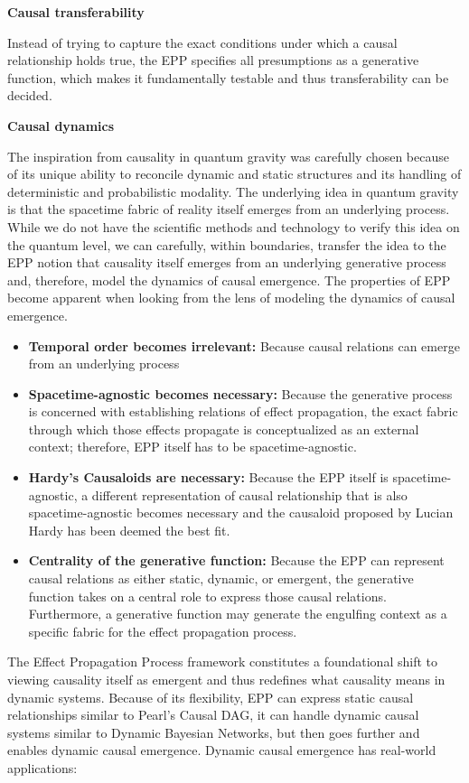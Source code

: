 \textbf{Causal transferability}

Instead of trying to capture the exact conditions under which a causal relationship holds true, the EPP specifies all presumptions as a generative function, which makes it fundamentally testable and thus transferability can be decided.

\textbf{Causal dynamics}

The inspiration from causality in quantum gravity was carefully chosen because of its unique ability to reconcile dynamic and static structures and its handling of deterministic and probabilistic modality. The underlying idea in quantum gravity is that the spacetime fabric of reality itself emerges from an underlying process. While we do not have the scientific methods and technology to verify this idea on the quantum level, we can carefully, within boundaries, transfer the idea to the EPP notion that causality itself emerges from an underlying generative process and, therefore, model the dynamics of causal emergence. The properties of EPP become apparent when looking from the lens of modeling the dynamics of causal emergence.

\begin{itemize}
    \item \textbf{Temporal order becomes irrelevant:} Because causal relations can emerge from an underlying process
    \item \textbf{Spacetime-agnostic becomes necessary:} Because the generative process is concerned with establishing relations of effect propagation, the exact fabric through which those effects propagate is conceptualized as an external context; therefore, EPP itself has to be spacetime-agnostic.
    \item \textbf{Hardy's Causaloids are necessary:} Because the EPP itself is spacetime-agnostic, a different representation of causal relationship that is also spacetime-agnostic becomes necessary and the causaloid proposed by Lucian Hardy has been deemed the best fit.
    \item \textbf{Centrality of the generative function:} Because the EPP can represent causal relations as either static, dynamic, or emergent, the generative function takes on a central role to express those causal relations. Furthermore, a generative function may generate the engulfing context as a specific fabric for the effect propagation process.
\end{itemize}


The Effect Propagation Process framework constitutes a  foundational shift to viewing causality itself as emergent and thus redefines what causality means in dynamic systems. Because of its flexibility, EPP can express static causal relationships similar to Pearl’s Causal DAG, it can handle dynamic causal systems similar to Dynamic Bayesian Networks, but then goes further and enables dynamic causal emergence. Dynamic causal emergence has real-world applications:

